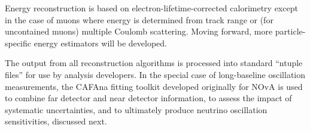 Energy reconstruction is based on electron-lifetime-corrected calorimetry except in the case of muons where energy is determined from track range or (for uncontained muons) multiple Coulomb scattering.  Moving forward, more particle-specific energy estimators will be developed.

The output from all reconstruction algorithms is processed into standard ``ntuple files'' for use by analysis developers.  In the special case of long-baseline oscillation measurements, the CAFAna fitting toolkit developed originally for NOvA is used to combine far detector and near detector information, to assess the impact of systematic uncertainties, and to ultimately produce neutrino oscillation sensitivities, discussed next.
